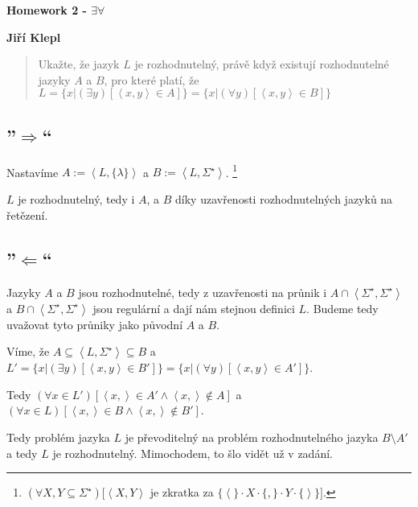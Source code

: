 \documentclass[a4paper,12pt]{article} %
\begin{document}
\thispagestyle{empty} %

\begin{center}
	{\Large \bf Homework 2 - $\exists\forall$}
	\vspace{2mm}

	{\bf Jiří Klepl}

\end{center}

\vspace{0.4cm}


\begin{quote}
	Ukažte, že jazyk $L$ je rozhodnutelný, právě když existují rozhodnutelné jazyky $A$ a $B$, pro které platí, že $L=\{x | (\exists y)[\left<x, y\right> \in A]\} = \{x | (\forall y)[\left<x,y\right> \in B]\}$
\end{quote}

\subsection*{''$\Rightarrow$``}

Nastavíme $A := \left<L, \{\lambda\}\right>$ a $B := \left<L,\Sigma^\star\right>$.
\footnote{$(\forall X, Y \subseteq \Sigma^\star)[\label{foot} \left< X, Y\right>$ je zkratka za $\{\left<\right.\} \cdot X \cdot \{,\} \cdot Y \cdot \{\left.\right>\}]$.}

$L$ je rozhodnutelný, tedy i $A$, a $B$ díky uzavřenosti rozhodnutelných jazyků na řetězení.

\subsection*{''$\Leftarrow$``}

Jazyky $A$ a $B$ jsou rozhodnutelné, tedy z uzavřenosti na průnik i $A \cap \left<\Sigma^\star, \Sigma^\star\right>$ a $B \cap \left<\Sigma^\star, \Sigma^\star\right>$ jsou regulární a dají nám stejnou definici $L$. Budeme tedy uvažovat tyto průniky jako původní $A$ a $B$.

Víme, že $A \subseteq \left<L,\Sigma^\star\right> \subseteq B$ a $L' = \{x | (\exists y)[\left<x, y\right> \in B']\} = \{x | (\forall y)[\left<x,y\right> \in A']\}$.

Tedy $(\forall x \in L')[\left<x,\right> \in A' \wedge \left<x,\right> \not\in A]$ a $(\forall x \in L)[\left<x,\right> \in B \wedge \left<x,\right> \not\in B']$.

Tedy problém jazyka $L$ je převoditelný na problém rozhodnutelného jazyka $B \setminus A'$ a tedy $L$ je rozhodnutelný. Mimochodem, to šlo vidět už v zadání.
\end{document}

